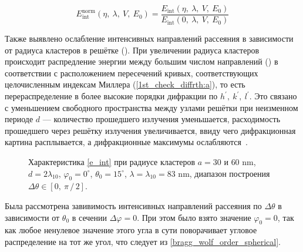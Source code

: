     \begin{equation}
        E_{\textrm{int}}^{\textrm{norm}} \left( \eta,\:\lambda, \:V, \:E_0 \right) = \frac{E_{\textrm{int}} \left( \eta,\:\lambda, \:V, \:E_0 \right)}{E_{\textrm{int}} \left( 0,\:\lambda, \:V, \:E_0 \right)}\label{e_int_norm}
    \end{equation}


Также выявлено ослабление интенсивных направлений рассеяния в зависимости от радиуса кластеров в решётке (). При увеличении радиуса кластеров происходит распредление энергии между большим числом направлений () в соответствии с расположением пересечений кривых, соответствующих целочисленным индексам Миллера (\autoref{1st_check_diffrth:a}), то есть перераспределение в более высокие порядки дифракции по $h^\prime,\:k^\prime,\:l^\prime$. Это связано с уменьшением свободного пространства между узлами решётки при неизменном периоде $d$ --- количество прошедшего излучения уменьшается, расходимость прошедшего через решётку излучения увеличивается, ввиду чего дифракционная картина расплывается, а дифракционные максимумы ослабляются~\cite{born_wolf}.

    \begin{figure}[H]
        \hfil
        \caption{Характеристика \autoref{e_int} при радиусе кластеров $a = 30$ и $60$ nm, $d = 2\lambda_{10}$, $\varphi_0 = 0^{\circ}$, $\theta_0 = 15^{\circ}$, $\lambda = \lambda_{10} = 83$ nm, диапазон построения $\Delta \theta \in \left[ 0,\:\pi\,/\,2 \right]$.}\label{radius_wawa:image}
    \end{figure}


Была рассмотрена завивимость интенсивных направлений рассеяния по $\Delta \theta$ в зависимости от $\theta_0$ в сечении $\Delta \varphi = 0$. При этом было взято значение $\varphi_0 = 0$, так как любое ненулевое значение этого угла в сути поворачивает угловое распределение на тот же угол, что следует из \autoref{bragg_wolf_order_spherical}.

